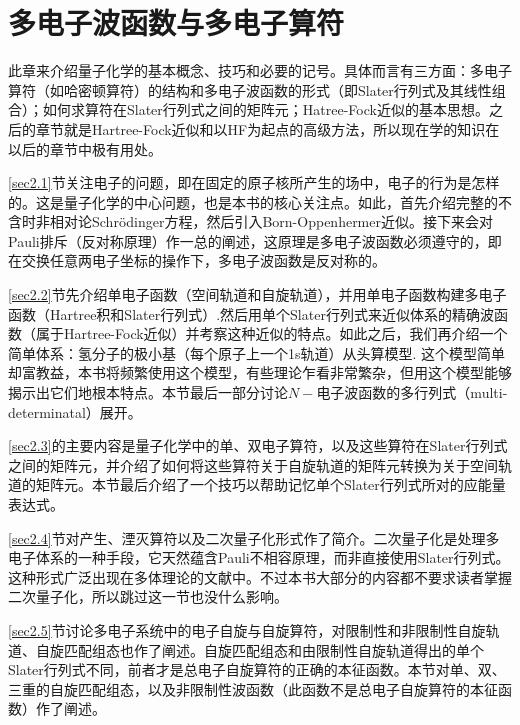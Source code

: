 
\chapter{多电子波函数与多电子算符}
\label{chap2}
此章来介绍量子化学的基本概念、技巧和必要的记号。具体而言有三方面：多电子算符（如哈密顿算符）的结构和多电子波函数的形式（即Slater行列式及其线性组合）；如何求算符在Slater行列式之间的矩阵元；Hatree-Fock近似的基本思想。之后的章节就是Hartree-Fock近似和以HF为起点的高级方法，所以现在学的知识在以后的章节中极有用处。

\ref{sec2.1}节关注电子的问题，即在固定的原子核所产生的场中，电子的行为是怎样的。这是量子化学的中心问题，也是本书的核心关注点。如此，首先介绍完整的不含时非相对论Schr\"odinger方程，然后引入Born-Oppenhermer近似。接下来会对Pauli排斥（反对称原理）作一总的阐述，这原理是多电子波函数必须遵守的，即在交换任意两电子坐标的操作下，多电子波函数是反对称的。

\ref{sec2.2}节先介绍单电子函数（空间轨道和自旋轨道），并用单电子函数构建多电子函数（Hartree积和Slater行列式）.然后用单个Slater行列式来近似体系的精确波函数（属于Hartree-Fock近似）并考察这种近似的特点。如此之后，我们再介绍一个简单体系：氢分子的极小基（每个原子上一个1s轨道）从头算模型. 这个模型简单却富教益，本书将频繁使用这个模型，有些理论乍看非常繁杂，但用这个模型能够揭示出它们地根本特点。本节最后一部分讨论$N-$电子波函数的多行列式（multi-determinatal）展开。

\ref{sec2.3}的主要内容是量子化学中的单、双电子算符，以及这些算符在Slater行列式之间的矩阵元，并介绍了如何将这些算符关于自旋轨道的矩阵元转换为关于空间轨道的矩阵元。本节最后介绍了一个技巧以帮助记忆单个Slater行列式所对的应能量表达式。

\ref{sec2.4}节对产生、湮灭算符以及二次量子化形式作了简介。二次量子化是处理多电子体系的一种手段，它天然蕴含Pauli不相容原理，而非直接使用Slater行列式。这种形式广泛出现在多体理论的文献中。不过本书大部分的内容都不要求读者掌握二次量子化，所以跳过这一节也没什么影响。

\ref{sec2.5}节讨论多电子系统中的电子自旋与自旋算符，对限制性和非限制性自旋轨道、自旋匹配组态也作了阐述。自旋匹配组态和由限制性自旋轨道得出的单个Slater行列式不同，前者才是总电子自旋算符的正确的本征函数。本节对单、双、三重的自旋匹配组态，以及非限制性波函数（此函数不是总电子自旋算符的本征函数）作了阐述。

